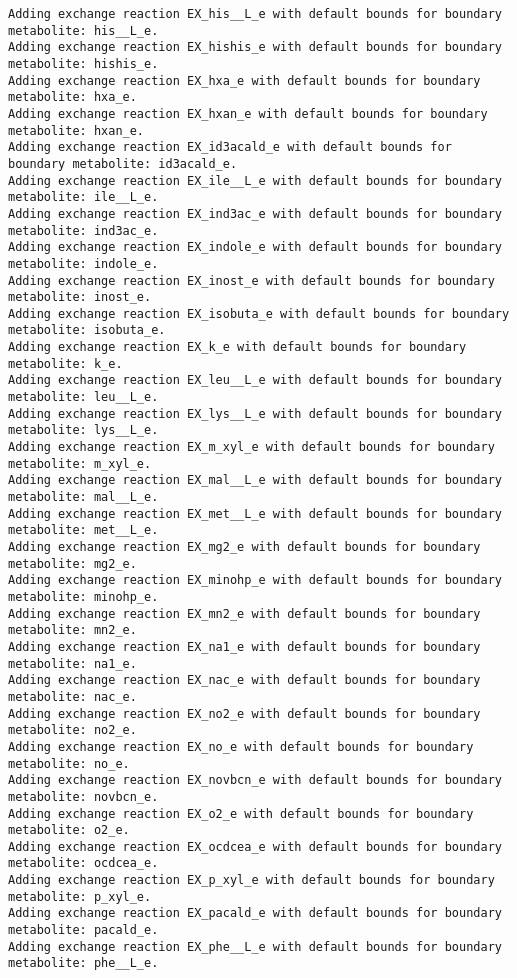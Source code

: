 \documentclass[
  letterpaper,
  DIV=11,
  numbers=noendperiod]{scrartcl}
\begin{document}
\begin{verbatim}
Adding exchange reaction EX_his__L_e with default bounds for boundary metabolite: his__L_e.
Adding exchange reaction EX_hishis_e with default bounds for boundary metabolite: hishis_e.
Adding exchange reaction EX_hxa_e with default bounds for boundary metabolite: hxa_e.
Adding exchange reaction EX_hxan_e with default bounds for boundary metabolite: hxan_e.
Adding exchange reaction EX_id3acald_e with default bounds for boundary metabolite: id3acald_e.
Adding exchange reaction EX_ile__L_e with default bounds for boundary metabolite: ile__L_e.
Adding exchange reaction EX_ind3ac_e with default bounds for boundary metabolite: ind3ac_e.
Adding exchange reaction EX_indole_e with default bounds for boundary metabolite: indole_e.
Adding exchange reaction EX_inost_e with default bounds for boundary metabolite: inost_e.
Adding exchange reaction EX_isobuta_e with default bounds for boundary metabolite: isobuta_e.
Adding exchange reaction EX_k_e with default bounds for boundary metabolite: k_e.
Adding exchange reaction EX_leu__L_e with default bounds for boundary metabolite: leu__L_e.
Adding exchange reaction EX_lys__L_e with default bounds for boundary metabolite: lys__L_e.
Adding exchange reaction EX_m_xyl_e with default bounds for boundary metabolite: m_xyl_e.
Adding exchange reaction EX_mal__L_e with default bounds for boundary metabolite: mal__L_e.
Adding exchange reaction EX_met__L_e with default bounds for boundary metabolite: met__L_e.
Adding exchange reaction EX_mg2_e with default bounds for boundary metabolite: mg2_e.
Adding exchange reaction EX_minohp_e with default bounds for boundary metabolite: minohp_e.
Adding exchange reaction EX_mn2_e with default bounds for boundary metabolite: mn2_e.
Adding exchange reaction EX_na1_e with default bounds for boundary metabolite: na1_e.
Adding exchange reaction EX_nac_e with default bounds for boundary metabolite: nac_e.
Adding exchange reaction EX_no2_e with default bounds for boundary metabolite: no2_e.
Adding exchange reaction EX_no_e with default bounds for boundary metabolite: no_e.
Adding exchange reaction EX_novbcn_e with default bounds for boundary metabolite: novbcn_e.
Adding exchange reaction EX_o2_e with default bounds for boundary metabolite: o2_e.
Adding exchange reaction EX_ocdcea_e with default bounds for boundary metabolite: ocdcea_e.
Adding exchange reaction EX_p_xyl_e with default bounds for boundary metabolite: p_xyl_e.
Adding exchange reaction EX_pacald_e with default bounds for boundary metabolite: pacald_e.
Adding exchange reaction EX_phe__L_e with default bounds for boundary metabolite: phe__L_e.

\end{verbatim}
\end{document}
